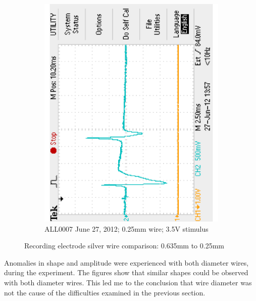 \begin{figure}[H]
\begin{singlespace}
\begin{subfigure}[b]{0.48\textwidth}
		\includegraphics[trim=0 0.1in 0 0.1in,clip,angle=-90,width=\textwidth]{./figures/F0007TEK_30b_120627} %
	\caption{ALL0007 June 27, 2012; 0.25mm wire; 3.5V stimulus}
	\end{subfigure}
	\caption{Recording electrode silver wire comparison: 0.635mm to 0.25mm\label{fig:22to30}}
	\end{singlespace}
\end{figure}

Anomalies in shape and amplitude were experienced with both diameter wires, during the experiment.  The figures show that similar shapes could be observed with both diameter wires.  This led me to the conclusion that wire diameter was not the cause of the difficulties examined in the previous section.
